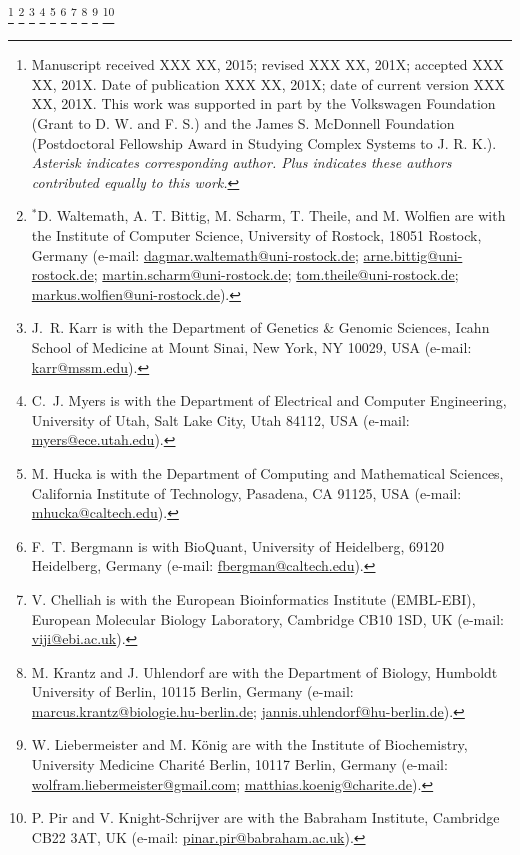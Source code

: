 \documentclass[journal,transmag]{IEEEtran}
\newcommand{\email}[1]{\href{mailto:#1}{#1}}
\begin{document}
{    \thanks{
        Manuscript received XXX XX, 2015; revised XXX XX, 201X; accepted XXX XX, 201X. Date of publication XXX XX, 201X; date of current version XXX XX, 201X.
        This work was supported in part by the Volkswagen Foundation (Grant to D. W. and F. S.) and the James S. McDonnell Foundation (Postdoctoral Fellowship Award in Studying Complex Systems to J. R. K.).
        \textit{Asterisk indicates corresponding author. Plus indicates these authors contributed equally to this work.}
    }
    \thanks{$^*$D. Waltemath, A. T. Bittig, M. Scharm, T. Theile, and M. Wolfien are with the Institute of Computer Science, University of Rostock, 18051 Rostock, Germany (e-mail: \email{dagmar.waltemath@uni-rostock.de}; \email{arne.bittig@uni-rostock.de}; \email{martin.scharm@uni-rostock.de}; \email{tom.theile@uni-rostock.de}; \email{markus.wolfien@uni-rostock.de}).}    
    \thanks{J.~R. Karr is with the Department of Genetics \& Genomic Sciences, Icahn School of Medicine at Mount Sinai, New York, NY 10029, USA (e-mail: \email{karr@mssm.edu}).}
    \thanks{C.~J. Myers is with the Department of Electrical and Computer Engineering, University of Utah, Salt Lake City, Utah 84112, USA (e-mail: \email{myers@ece.utah.edu}).}
    \thanks{M. Hucka is with the Department of Computing and Mathematical Sciences, California Institute of Technology, Pasadena, CA 91125, USA (e-mail: \email{mhucka@caltech.edu}).}
    \thanks{F.~T. Bergmann is with BioQuant, University of Heidelberg, 69120 Heidelberg, Germany (e-mail: \email{fbergman@caltech.edu}).} 
    \thanks{V. Chelliah is with the European Bioinformatics Institute (EMBL-EBI), European Molecular Biology Laboratory, Cambridge CB10 1SD, UK (e-mail: \email{viji@ebi.ac.uk}).}   
    \thanks{M. Krantz and J. Uhlendorf are with the Department of Biology, Humboldt University of Berlin, 10115 Berlin, Germany (e-mail: \email{marcus.krantz@biologie.hu-berlin.de}; \email{jannis.uhlendorf@hu-berlin.de}).}
    \thanks{W. Liebermeister and M. K\"{o}nig are with the Institute of Biochemistry, University Medicine Charit\'{e} Berlin, 10117 Berlin, Germany (e-mail: \email{wolfram.liebermeister@gmail.com}; \email{matthias.koenig@charite.de}).}
    \thanks{P. Pir and V. Knight-Schrijver are with the Babraham Institute, Cambridge CB22 3AT, UK (e-mail: \email{pinar.pir@babraham.ac.uk}).}
}
\end{document}
